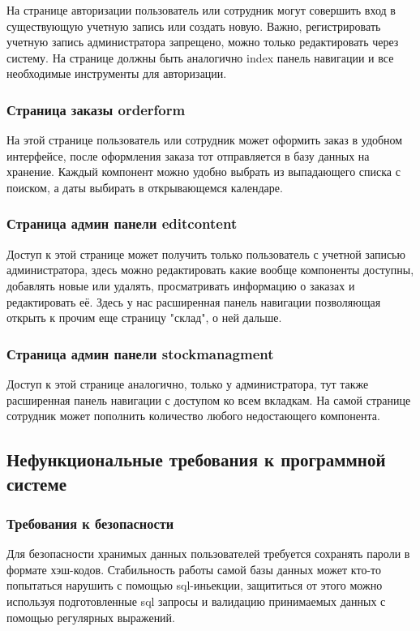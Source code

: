 На странице авторизации пользователь или сотрудник могут совершить вход в существующую учетную запись или создать новую. Важно, регистрировать учетную запись администратора запрещено, можно только редактировать через систему. На странице должны быть аналогично index панель навигации и все необходимые инструменты для авторизации.

\subsubsection{Страница заказы orderform}

На этой странице пользователь или сотрудник может оформить заказ в удобном интерфейсе, после оформления заказа тот отправляется в базу данных на хранение. Каждый компонент можно удобно выбрать из выпадающего списка с поиском, а даты выбирать в открывающемся календаре.

\subsubsection{Страница админ панели editcontent}

Доступ к этой странице может получить только пользователь с учетной записью администратора, здесь можно редактировать какие вообще компоненты доступны, добавлять новые или удалять, просматривать информацию о заказах и редактировать её. Здесь у нас расширенная панель навигации позволяющая открыть к прочим еще страницу "склад", о ней дальше.

\subsubsection{Страница админ панели stockmanagment}

Доступ к этой странице аналогично, только у администратора, тут также расширенная панель навигации с доступом ко всем вкладкам. На самой странице сотрудник может пополнить количество любого недостающего компонента.

\subsection{Нефункциональные требования к программной системе}

\subsubsection{Требования к безопасности}
Для безопасности хранимых данных пользователей требуется сохранять пароли в формате  хэш-кодов. Стабильность работы самой базы данных может кто-то попытаться нарушить с помощью sql-иньекции, защититься от этого можно используя подготовленные sql запросы и валидацию принимаемых данных с помощью регулярных выражений.
